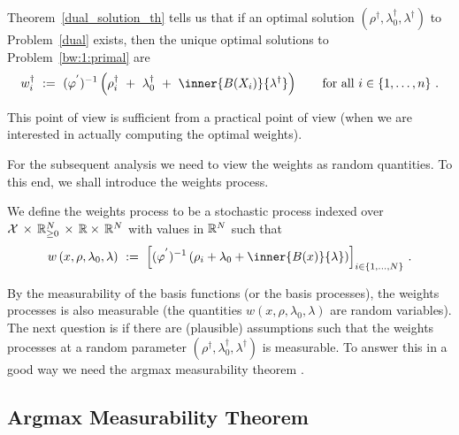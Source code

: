 Theorem~\ref{dual_solution_th} tells us that if an optimal solution
$
(\rho^\dagger,\lambda_0^\dagger,\lambda^\dagger)
$
to Problem~\ref{dual} exists,
then the unique optimal solutions to Problem~\ref{bw:1:primal} are 
\begin{gather*}
  w^\dagger_i
  \ 
  :=
  \ 
  (
  \varphi^{'}
  )^{-1}
  \left(
    \rho^\dagger_i
  \ 
    +
  \ 
\lambda_0^\dagger
  \ 
+
  \ 
\inner
{B(X_i)}
{
\lambda^{\dagger}
}
  \right)
  \qquad
  \text{for all}\ 
  i\in
  \left\{ 1,\ldots,n \right\}
  \,.
\end{gather*}

This point of view is sufficient from a practical point of view
(when we are interested in actually computing the optimal weights).

For the subsequent analysis we need to view the weights as random quantities. To this end, we shall introduce the weights process. 

\begin{definition}
  \label{def:weights_function}
  We define the weights process to be a stochastic process indexed 
  over
  $
  \mathcal{X}
  \,
  \times
  \,
  \mathbb{R}^N_{\ge 0}
  \,
  \times
  \,
  \mathbb{R}
  \times
  \,
  \mathbb{R}^{N}
  $
  with values in $\mathbb{R}^N$ such that
\begin{align*}
  w
  \left( 
  x
  ,
  \rho
  ,
  \lambda_0
  ,
  \lambda
  \right)
  \ 
  :=
  \ 
  \left[ 
    (
    \varphi^{'}
    )^{-1}
    \left( 
     \rho_i 
     +
      \lambda_0
      +
      \inner{B(x)}{\lambda}
    \right)
  \right]_{i\in \left\{ 1, \ldots,N \right\}}
    \,.
\end{align*}
\end{definition}
By the measurability of the basis functions (or the basis processes),
the weights processes is also measurable 
(the quantities 
$
  w
  \left( 
  x
  ,
  \rho
  ,
  \lambda_0
  ,
  \lambda
  \right)
$
are random variables).
The next question is if there are (plausible) assumptions such that the weights processes at a random parameter
$
(\rho^\dagger,\lambda_0^\dagger,\lambda^\dagger)
$
is measurable.
To answer this in a good way we need the argmax measurability theorem \cite[Theorem~18.19]{Aliprantis2007}.
\subsection{Argmax Measurability Theorem}


